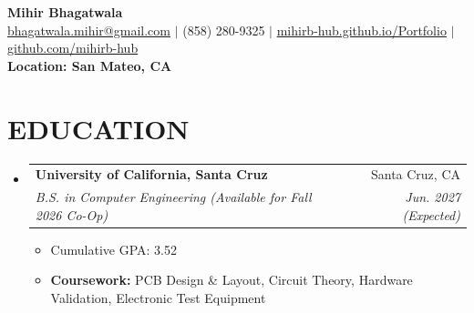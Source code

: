 \documentclass[letterpaper,11pt]{article}
\makeatletter
\newcommand{\resumeItem}[1]{
  \item\small{
    {#1 \vspace{-2pt}}
  }
}
\newcommand{\resumeSubheading}[4]{
  \vspace{-2pt}\item
    \begin{tabular*}{0.97\textwidth}[t]{l@{\extracolsep{\fill}}r}
      \textbf{#1} & #2 \\
      \textit{\small#3} & \textit{\small #4} \\
    \end{tabular*}\vspace{-7pt}
}
\newcommand{\resumeSubHeadingListStart}{\begin{itemize}[leftmargin=0.15in, label={}]}
\newcommand{\resumeSubHeadingListEnd}{\end{itemize}}
\newcommand{\resumeItemListStart}{\begin{itemize}}
\newcommand{\resumeItemListEnd}{\end{itemize}\vspace{-5pt}}
\makeatother
\begin{document}

\begin{center}
    \textbf{\Huge Mihir Bhagatwala} \\ \vspace{5pt}
    \small \href{mailto:bhagatwala.mihir@gmail.com}{bhagatwala.mihir@gmail.com} $|$ (858) 280-9325 $|$ \href{https://mihirb-hub.github.io/Portfolio/}{mihirb-hub.github.io/Portfolio} $|$ \href{https://github.com/mihirb-hub}{github.com/mihirb-hub} \\ \vspace{2pt}
    \textbf{Location: San Mateo, CA}
\end{center}


\section{EDUCATION}
  \resumeSubHeadingListStart
    \resumeSubheading
      {University of California, Santa Cruz}{Santa Cruz, CA}
      {B.S. in Computer Engineering (Available for Fall 2026 Co-Op)}{Jun. 2027 (Expected)}
      \resumeItemListStart
        \resumeItem{Cumulative GPA: 3.52}
        \resumeItem{\textbf{Coursework:} PCB Design \& Layout, Circuit Theory, Hardware Validation, Electronic Test Equipment}
      \resumeItemListEnd
  \resumeSubHeadingListEnd


\end{document}
